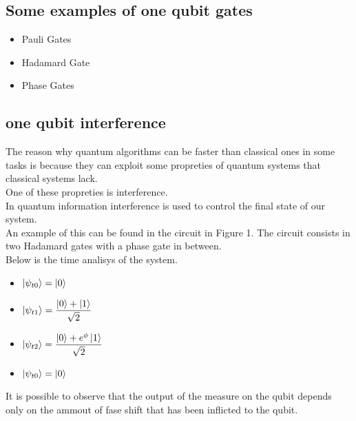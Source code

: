 \documentclass{article}
\begin{document}
\subsection{Some examples of one qubit gates}

\begin{itemize}

\item
  Pauli Gates

\item
  Hadamard Gate
  
\item
  Phase Gates
  
\end{itemize}

\subsection{one qubit interference}


The reason why quantum algorithms can be faster than classical ones
in some tasks is because they can exploit some propreties of quantum
systems that classical systems lack.\\
One of these propreties is interference.\\
In quantum information interference is used to control the final
state of our system.\\
An example of this can be found in the circuit in Figure 1.
The circuit consists in two Hadamard gates with a phase gate
in between.\\
Below is the time analisys of the system.
\begin{itemize}

\item $\ket{\psi_{t0}} = \ket{0}$
\item $\ket{\psi_{t1}} = \dfrac{\ket{0}+\ket{1}}{\sqrt{2}}$
\item $\ket{\psi_{t2}} = \dfrac{\ket{0}+e^{\phi}\ket{1}}{\sqrt{2}}$
\item $\ket{\psi_{t0}} = \ket{0}$
  
  
\end{itemize}



It is possible to observe that the output of the measure on the qubit
depends only on the ammout of fase shift that has been inflicted
to the qubit.
\end{document}
